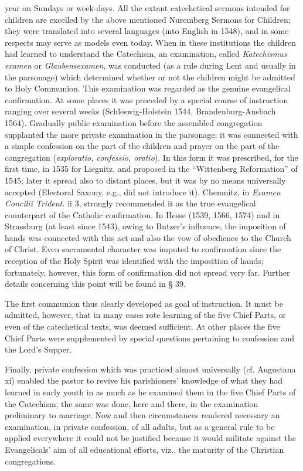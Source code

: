 year on Sundays or week-days. All the extant catechetical sermons intended for children are excelled by the above mentioned Nuremberg Sermons for Children; they were translated into several languages (into English in 1548), and in some respects may serve as models even today. When in these institutions the children had learned to understand the Catechism, an examination, called \emph{Katechismus examen} or \emph{Glaubensexamen}, was conducted (as a rule during Lent and usually in the parsonage) which determined whether or not the children might be admitted to Holy Communion. This examination was regarded as the genuine evangelical confirmation. At some places it was preceded by a special course of instruction ranging over several weeks (Schleswig-Holstein 1544, Brandenburg-Ansbach 1564). Gradually public examination before the assembled congregation supplanted the more private examination in the parsonage; it was connected with a simple confession on the part of the children and prayer on the part of the congregation (\emph{exploratio, confessio, oratio}). In this form it was prescribed, for the first time, in 1535 for Liegnitz, and proposed in the “Wittenberg Reformation” of 1545; later it spread also to distant places, but it was by no means universally accepted (Electoral Saxony, e.g., did not introduce it). Chemnitz, in \emph{Examen Concilii Trident.} ii 3, strongly recommended it as the true evangelical counterpart of the Catholic confirmation. In Hesse (1539, 1566, 1574) and in Strassburg (at least since 1543), owing to Butzer’s influence, the imposition of hands was connected with this act and also the vow of obedience to the Church of Christ. Even sacramental character was imputed to confirmation since the reception of the Holy Spirit was identified with the imposition of hands; fortunately, however, this form of confirmation did not spread very far. Further details concerning this point will be found in § 39.

The first communion thus clearly developed as goal of
instruction. It must be admitted, however, that in many cases rote learning of the five Chief Parts, or even of the catechetical texts, was deemed sufficient. At other places the five Chief Parts were supplemented by special questions pertaining to confession and the Lord’s Supper.

Finally, private confession which was practiced almost universally (cf. Augustana xi) enabled the pastor to revive his parishioners’ knowledge of what they had learned in early youth in as much as he examined them in the five Chief Parts of the Catechism; the same was done, here and there, in the examination preliminary to marriage. Now and then circumstances rendered necessary an examination, in private confession, of all adults, but as a general rule to be applied everywhere it could not be justified because it would militate against the Evangelicals’ aim of all educational efforts, viz., the maturity of the Christian congregations.

